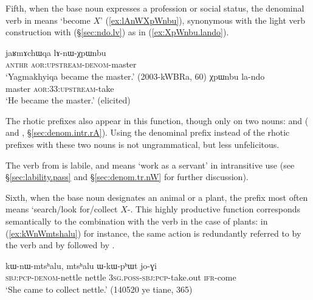  Fifth, when the base noun expresses a profession or social status, the denominal verb in  means `become $X$' (\ref{ex:lAnWXpWnbu}), synonymous with the light verb construction with  (§\ref{sec:ndo.lv}) as in (\ref{ex:XpWnbu.lando}). 
  
 \begin{exe}
\ex 
 \begin{xlist}
 \ex \label{ex:lAnWXpWnbu}
\gll jaʁmɤchɯqa lɤ-nɯ-χpɯnbu  \\
\textsc{anthr} \textsc{aor}:\textsc{upstream}-\textsc{denom}-master \\
\glt `Yagmakhyiqa became the master.' (2003-kWBRa, 60)
 \ex \label{ex:XpWnbu.lando}
\gll χpɯnbu la-ndo \\
 master \textsc{aor}:3\fl{}3:\textsc{upstream}-take \\
\glt `He became the master.' (elicited)
\end{xlist}
\end{exe}

The rhotic prefixes also appear in this function, though only on two nouns:  and  ( and , §\ref{sec:denom.intr.rA}). Using the  denominal prefix instead of the rhotic prefixes with these two nouns is not ungrammatical, but less unfelicitous.

The verb  from   is labile, and means `work as a servant' in intransitive use (see §\ref{sec:lability.pass}  and §\ref{sec:denom.tr.nW} for further discussion).
  
 Sixth, when the base noun designates an animal or a plant, the  prefix most often means `search/look for/collect $X$-. This highly productive function corresponds semantically to the combination with the verb  in the case of plants: in (\ref{ex:kWnWmtshalu}) for instance, the same action is redundantly referred to by the verb  and by  followed by .
 
 \begin{exe}
\ex \label{ex:kWnWmtshalu}
\gll  kɯ-nɯ-mtsʰalu, mtsʰalu ɯ-kɯ-pʰɯt jo-ɣi   \\
\textsc{sbj}:\textsc{pcp}-\textsc{denom}-nettle nettle \textsc{3sg}.\textsc{poss}-\textsc{sbj}:\textsc{pcp}-take.out \textsc{ifr}-come \\
\glt `She came to collect nettle.' (140520 ye tiane, 365)
\end{exe}
 
